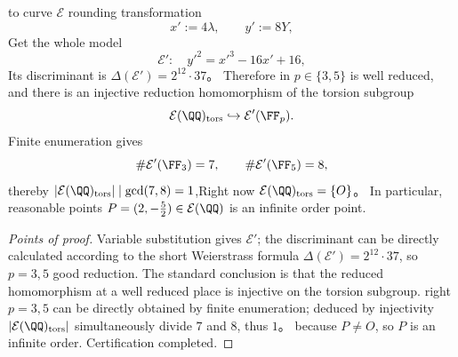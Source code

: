 

\begin{conclusion}\label{con:xi-terminal-zm-elliptic-torsion-trivial}
to curve \(\mathcal{E}\) rounding transformation
\[
x':=4\lambda,\qquad y':=8Y,
\]
Get the whole model
\[
\mathcal{E}':\quad {y'}^{2}={x'}^{3}-16x'+16,
\]
Its discriminant is \(\Delta(\mathcal{E}')=2^{12}\cdot 37\)。
Therefore in \(p\in\{3,5\}\) is well reduced, and there is an injective reduction homomorphism of the torsion subgroup
\[
\mathcal{E}(\QQ)_{\mathrm{tors}}\hookrightarrow \mathcal{E}'(\FF_p).
\]
Finite enumeration gives
\[
\#\mathcal{E}'(\FF_{3})=7,\qquad \#\mathcal{E}'(\FF_{5})=8,
\]
thereby \(|\mathcal{E}(\QQ)_{\mathrm{tors}}|\mid\gcd(7,8)=1\),Right now \(\mathcal{E}(\QQ)_{\mathrm{tors}}=\{O\}\)。
In particular, reasonable points \(P=(2,-\tfrac52)\in\mathcal{E}(\QQ)\) is an infinite order point.
\end{conclusion}
\begin{proof}[Points of proof]
Variable substitution gives \(\mathcal{E}'\); the discriminant can be directly calculated according to the short Weierstrass formula \(\Delta(\mathcal{E}')=2^{12}\cdot37\), so \(p=3,5\) good reduction.
The standard conclusion is that the reduced homomorphism at a well reduced place is injective on the torsion subgroup.
right \(p=3,5\) can be directly obtained by finite enumeration; deduced by injectivity \(|\mathcal{E}(\QQ)_{\mathrm{tors}}|\) simultaneously divide \(7\) and \(8\), thus \(1\)。
because \(P\neq O\), so \(P\) is an infinite order. Certification completed.
\end{proof}

